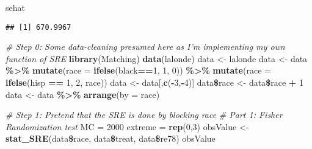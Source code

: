 \documentclass[]{article}
\newenvironment{Shaded}{\begin{snugshade}}{\end{snugshade}}
\newcommand{\KeywordTok}[1]{\textcolor[rgb]{0.13,0.29,0.53}{\textbf{#1}}}
\newcommand{\DataTypeTok}[1]{\textcolor[rgb]{0.13,0.29,0.53}{#1}}
\newcommand{\DecValTok}[1]{\textcolor[rgb]{0.00,0.00,0.81}{#1}}
\newcommand{\StringTok}[1]{\textcolor[rgb]{0.31,0.60,0.02}{#1}}
\newcommand{\CommentTok}[1]{\textcolor[rgb]{0.56,0.35,0.01}{\textit{#1}}}
\newcommand{\OperatorTok}[1]{\textcolor[rgb]{0.81,0.36,0.00}{\textbf{#1}}}
\newcommand{\NormalTok}[1]{#1}
\begin{document}
\begin{Shaded}
\begin{Highlighting}[]
\NormalTok{sehat}
\end{Highlighting}
\end{Shaded}

\begin{verbatim}
## [1] 670.9967
\end{verbatim}

\begin{Shaded}
\begin{Highlighting}[]
\CommentTok{# Step 0: Some data-cleaning presumed here as I'm implementing my own function of SRE}
\KeywordTok{library}\NormalTok{(Matching)}
\KeywordTok{data}\NormalTok{(lalonde)}
\NormalTok{data <-}\StringTok{ }\NormalTok{lalonde}
\NormalTok{data <-}\StringTok{ }\NormalTok{data }\OperatorTok{\%>\%}
\StringTok{  }\KeywordTok{mutate}\NormalTok{(}\DataTypeTok{race =} \KeywordTok{ifelse}\NormalTok{(black}\OperatorTok{==}\DecValTok{1}\NormalTok{, }\DecValTok{1}\NormalTok{, }\DecValTok{0}\NormalTok{)) }\OperatorTok{\%>\%}
\StringTok{  }\KeywordTok{mutate}\NormalTok{(}\DataTypeTok{race =} \KeywordTok{ifelse}\NormalTok{(hisp }\OperatorTok{==}\StringTok{ }\DecValTok{1}\NormalTok{, }\DecValTok{2}\NormalTok{, race))}
\NormalTok{data <-}\StringTok{ }\NormalTok{data[,}\KeywordTok{c}\NormalTok{(}\OperatorTok{-}\DecValTok{3}\NormalTok{,}\OperatorTok{-}\DecValTok{4}\NormalTok{)]}
\NormalTok{data}\OperatorTok{\$}\NormalTok{race <-}\StringTok{ }\NormalTok{data}\OperatorTok{\$}\NormalTok{race }\OperatorTok{+}\StringTok{ }\DecValTok{1}
\NormalTok{data <-}\StringTok{ }\NormalTok{data }\OperatorTok{\%>\%}
\StringTok{  }\KeywordTok{arrange}\NormalTok{(}\DataTypeTok{by =}\NormalTok{ race)}
\end{Highlighting}
\end{Shaded}

\begin{Shaded}
\begin{Highlighting}[]
\CommentTok{# Step 1: Pretend that the SRE is done by blocking race}
\CommentTok{# Part 1: Fisher Randomization test}
\NormalTok{MC =}\StringTok{ }\DecValTok{2000}
\NormalTok{extreme =}\StringTok{ }\KeywordTok{rep}\NormalTok{(}\DecValTok{0}\NormalTok{,}\DecValTok{3}\NormalTok{)}
\NormalTok{obsValue <-}\StringTok{ }\KeywordTok{stat_SRE}\NormalTok{(data}\OperatorTok{\$}\NormalTok{race, data}\OperatorTok{\$}\NormalTok{treat, data}\OperatorTok{\$}\NormalTok{re78)}
\NormalTok{obsValue}
\end{Highlighting}
\end{Shaded}
\end{document}

